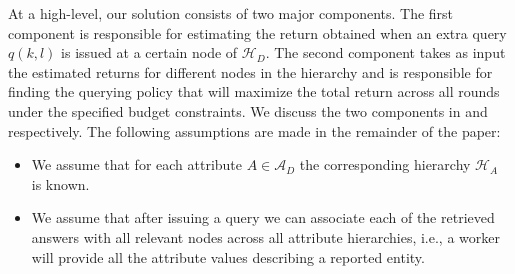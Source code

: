\documentclass{vldb}
\newcommand{\attributes}{\mathcal{A}_D}
\newcommand{\hierarchy}{\mathcal{H}_D}
\newcommand{\attrhierarchy}{\mathcal{H}_A}
\begin{document}
At a high-level, our solution consists of two major components. The first component is responsible for estimating the return obtained when an extra query $q(k,l)$ is issued at a certain node of $\hierarchy$. The second component takes as input the estimated returns for different nodes in the hierarchy and is responsible for finding the querying policy that will maximize the total return across all rounds under the specified budget constraints. We discuss the two components in  and  respectively.  The following assumptions are made in the remainder of the paper:
\begin{itemize}
\item We assume that for each attribute $A \in \attributes$ the corresponding hierarchy $\attrhierarchy$ is known. 
\item We assume that after issuing a query we can associate each of the retrieved answers with all relevant nodes across all attribute hierarchies, i.e., a worker will provide all the attribute values describing a reported entity.
\end{itemize}

%
\end{document}
